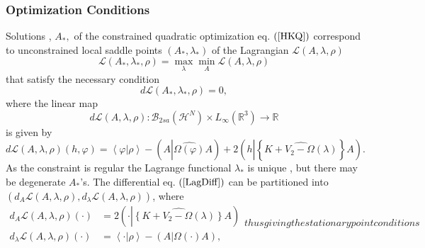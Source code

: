 \documentclass[aps,preprint]{revtex4}%
\begin{document}
\subsubsection{Optimization Conditions\label{OpCon}}

Solutions , $A_{\ast},$ of the constrained quadratic optimization eq. $\left(
\ref{HKQ}\right)  $ correspond to unconstrained local saddle points $\left(
A_{\ast},\lambda_{\ast}\right)  $ \cite{Hestenes75} of the Lagrangian
$\mathcal{L}\left(  A,\lambda,\rho\right)  $
\begin{equation}
\mathcal{L}\left(  A_{\ast},\lambda_{\ast},\rho\right)  =\max_{\lambda}%
\min_{A}\mathcal{L}\left(  A,\lambda,\rho\right)
\end{equation}
that satisfy the necessary condition
\begin{equation}
d\mathcal{L}\left(  A_{\ast},\lambda_{\ast},\rho\right)  =0,
\end{equation}
where the linear map
\begin{equation}
d\mathcal{L}\left(  A,\lambda,\rho\right)  :\mathcal{B}_{2sa}\left(
\mathcal{H}^{N}\right)  \times L_{\infty}\left(  \mathbb{R}^{3}\right)
\rightarrow\mathbb{R}%
\end{equation}
is given by%
\begin{equation}
d\mathcal{L}\left(  A,\lambda,\rho\right)  \left(  h,\varphi\right)
=\left\langle \varphi\left\vert \rho\right.  \right\rangle -\left(
A\left\vert \widehat{\Omega\left(  \varphi\right)  }\right.  A\right)
+2\left(  h\left\vert \left\{  \widehat{K+V_{2}-\Omega\left(  \lambda\right)
}\right\}  \right.  A\right)  .\label{LagDiff}%
\end{equation}
As the constraint is regular the Lagrange functional $\lambda_{\ast}$ is
unique \cite{Hestenes75}, but there may be degenerate $A_{\ast}$'s. The
differential eq. $\left(  \ref{LagDiff}\right)  $ can be partitioned into
$\left(  d_{A}\mathcal{L}\left(  A,\lambda,\rho\right)  ,d_{\lambda
}\mathcal{L}\left(  A,\lambda,\rho\right)  \right)  $, where
\begin{subequations}
\label{differential}%
\begin{align}
d_{A}\mathcal{L}\left(  A,\lambda,\rho\right)  \left(  \cdot\right)   &
=2\left(  \cdot\left\vert \widehat{\left\{  K+V_{2}-\Omega\left(
\lambda\right)  \right\}  }\right.  A\right)  \\
d_{\lambda}\mathcal{L}\left(  A,\lambda,\rho\right)  \left(  \cdot\right)   &
=\left\langle \cdot\left\vert \rho\right.  \right\rangle -\left(  A\left\vert
\Omega\left(  \cdot\right)  \right.  A\right)  ,
\end{align}
thus giving the stationary point conditions
\end{subequations}
\end{document}
